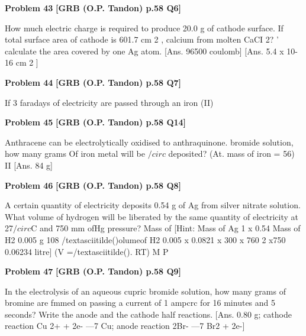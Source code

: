 \begin{problembox}
\textbf{Problem 43} \hfill \textbf{[GRB (O.P. Tandon) p.58 Q6]}
\label{q:ext-grb_all_questions-43}

How much electric charge is required to produce 20.0 g of 
cathode surface. If total surface area of cathode is 601.7 cm
2
, 
calcium from molten CaCI
2? ' 
calculate the area covered by one Ag atom. 
[Ans. 
96500 coulomb] 
[Ans. 
5.4 x 10-
16 cm
2
]
\end{problembox}

\begin{problembox}
\textbf{Problem 44} \hfill \textbf{[GRB (O.P. Tandon) p.58 Q7]}
\label{q:ext-grb_all_questions-44}

If 3 faradays of electricity are passed through an iron (II)
\end{problembox}

\begin{problembox}
\textbf{Problem 45} \hfill \textbf{[GRB (O.P. Tandon) p.58 Q14]}
\label{q:ext-grb_all_questions-45}

Anthracene can be electrolytically oxidised to anthraquinone. 
bromide solution, how many grams Of iron metal will be 
$/circ$ 
deposited? (At. mass of iron = 56) 
II 
[Ans. 
84 g]
\end{problembox}

\begin{problembox}
\textbf{Problem 46} \hfill \textbf{[GRB (O.P. Tandon) p.58 Q8]}
\label{q:ext-grb_all_questions-46}

A certain quantity of electricity deposits 0.54 g of Ag from 
silver nitrate solution. What volume of hydrogen will be 
liberated by the same quantity of electricity at 27$/circ$C and 
750 mm ofHg pressure? 
Mass of 
[Hint: 
Mass of Ag 
1 x 0.54 
Mass of H2 
0.005 g 
108 
/textasciitilde()olumeof H2 
0.005 x 0.0821 x 300 x 760 
2 x750 
0.06234 litre] 
(V =/textasciitilde(). RT) 
M 
P
\end{problembox}

\begin{problembox}
\textbf{Problem 47} \hfill \textbf{[GRB (O.P. Tandon) p.58 Q9]}
\label{q:ext-grb_all_questions-47}

In the electrolysis of an aqueous cupric bromide solution, how 
many grams of bromine are fmmed on passing a current of 1 
ampcrc for 16 minutes and 5 seconds? Write the anode and the 
cathode half reactions. 
[Ans. 
0.80 g; cathode reaction Cu 2+ + 2e- ---7 Cu; 
anode reaction 2Br- ---7 Br2 + 2e-]
\end{problembox}


